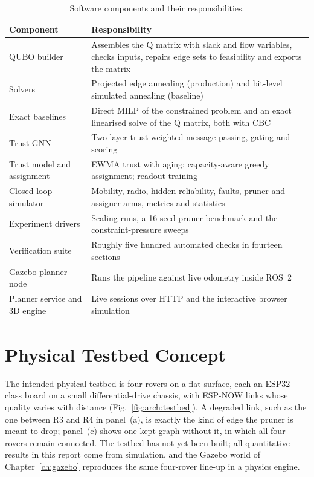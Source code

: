 \begin{table}[htbp]
\centering
\caption{Software components and their responsibilities.}
\label{tab:arch:software}
\small
\begin{tabularx}{\linewidth}{@{}l X@{}}
\toprule
Component & Responsibility \\
\midrule
QUBO builder & Assembles the Q matrix with slack and flow variables, checks inputs, repairs edge sets to feasibility and exports the matrix \\
Solvers & Projected edge annealing (production) and bit-level simulated annealing (baseline) \\
Exact baselines & Direct MILP of the constrained problem and an exact linearised solve of the Q matrix, both with CBC \\
Trust GNN & Two-layer trust-weighted message passing, gating and scoring \\
Trust model and assignment & EWMA trust with aging; capacity-aware greedy assignment; readout training \\
Closed-loop simulator & Mobility, radio, hidden reliability, faults, pruner and assigner arms, metrics and statistics \\
Experiment drivers & Scaling runs, a 16-seed pruner benchmark and the constraint-pressure sweeps \\
Verification suite & Roughly five hundred automated checks in fourteen sections \\
Gazebo planner node & Runs the pipeline against live odometry inside ROS~2 \\
Planner service and 3D engine & Live sessions over HTTP and the interactive browser simulation \\
\bottomrule
\end{tabularx}
\end{table}

\section{Physical Testbed Concept}

The intended physical testbed is four rovers on a flat surface, each an
ESP32-class board on a small differential-drive chassis, with ESP-NOW links
whose quality varies with distance (Fig.~\ref{fig:arch:testbed}). A degraded
link, such as the one between R3 and R4 in panel~(a), is exactly the kind of
edge the pruner is meant to drop; panel~(c) shows one kept graph without it,
in which all four rovers remain connected. The testbed has not yet
been built; all quantitative results in this report come from simulation, and
the Gazebo world of Chapter~\ref{ch:gazebo} reproduces the same four-rover
line-up in a physics engine.

